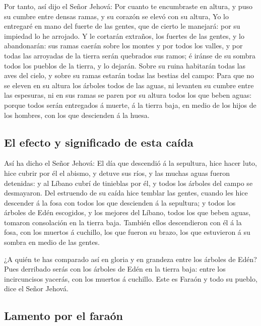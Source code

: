  Por tanto, así dijo el Señor Jehová: Por cuanto te
encumbraste en altura, y puso su cumbre entre densas ramas, y su corazón
se elevó con su altura,  Yo lo entregaré en mano del fuerte
de las gentes, que de cierto le manejará: por su impiedad lo he
arrojado.  Y le cortarán extraños, los fuertes de las
gentes, y lo abandonarán: sus ramas caerán sobre los montes y por todos
los valles, y por todas las arroyadas de la tierra serán quebrados sus
ramos; é iránse de su sombra todos los pueblos de la tierra, y lo
dejarán.  Sobre su ruina habitarán todas las aves del
cielo, y sobre su ramas estarán todas las bestias del campo:
 Para que no se eleven en su altura los árboles todos de
las aguas, ni levanten su cumbre entre las espesuras, ni en sus ramas se
paren por su altura todos los que beben aguas: porque todos serán
entregados á muerte, á la tierra baja, en medio de los hijos de los
hombres, con los que descienden á la huesa.

\hypertarget{el-efecto-y-significado-de-esta-cauxedda}{%
\subsection{El efecto y significado de esta
caída}\label{el-efecto-y-significado-de-esta-cauxedda}}

 Así ha dicho el Señor Jehová: El día que descendió á la
sepultura, hice hacer luto, hice cubrir por él el abismo, y detuve sus
ríos, y las muchas aguas fueron detenidas: y al Líbano cubrí de
tinieblas por él, y todos los árboles del campo se desmayaron.
 Del estruendo de su caída hice temblar las gentes, cuando
les hice descender á la fosa con todos los que descienden á la
sepultura; y todos los árboles de Edén escogidos, y los mejores del
Líbano, todos los que beben aguas, tomaron consolación en la tierra
baja.  También ellos descendieron con él á la fosa, con los
muertos á cuchillo, los que fueron su brazo, los que estuvieron á su
sombra en medio de las gentes.

 ¿A quién te has comparado así en gloria y en grandeza
entre los árboles de Edén? Pues derribado serás con los árboles de Edén
en la tierra baja: entre los incircuncisos yacerás, con los muertos á
cuchillo. Este es Faraón y todo su pueblo, dice el Señor Jehová.

\hypertarget{lamento-por-el-farauxf3n}{%
\subsection{Lamento por el faraón}\label{lamento-por-el-farauxf3n}}

